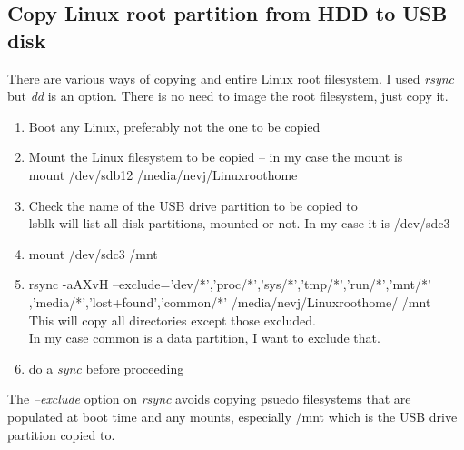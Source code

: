 \documentclass{article}  %
\begin{document}
\subsection{Copy Linux root partition from HDD to USB disk}
There are various ways of copying and entire Linux root filesystem. I used {\em rsync} but {\em dd} is an option. There is no need to image the root filesystem, just copy it.

\begin{enumerate}
\item Boot any Linux, preferably not  the one to be copied
\item Mount the Linux filesystem to be copied -- in my case the mount is \\
mount /dev/sdb12 /media/nevj/Linuxroothome
\item Check the name of the USB drive partition to be copied to  \\
 lsblk will list all disk partitions, mounted or not.  In my case it is /dev/sdc3
\item mount /dev/sdc3 /mnt
\item rsync -aAXvH --exclude={'dev/*','proc/*','sys/*','tmp/*','run/*','mnt/*' \\
      ,'media/*','lost+found','common/*'} /media/nevj/Linuxroothome/ /mnt  \\
This will copy all directories except those excluded. \\
In my case common is a data partition, I want to exclude that.
\item do a {\em sync} before proceeding
\end{enumerate}
The {\em --exclude} option on {\em rsync} avoids copying psuedo filesystems that are populated at boot time and any mounts, especially /mnt which is the USB drive partition copied to.
\end{document}

